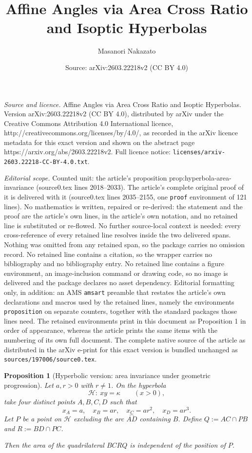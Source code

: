 \documentclass[10pt,a4paper]{amsart}
\title{Affine Angles via Area Cross Ratio and Isoptic Hyperbolas}
\author{Masanori Nakazato}
\date{Source: arXiv:2603.22218v2 (CC BY 4.0)}
\newtheorem{proposition}{Proposition}
\begin{document}
\maketitle

\noindent\emph{Source and licence.} Affine Angles via Area Cross Ratio and Isoptic Hyperbolas. Version arXiv:2603.22218v2 (CC BY 4.0), distributed by arXiv under the Creative Commons Attribution 4.0 International licence, http://creativecommons.org/licenses/by/4.0/, as recorded in the arXiv licence metadata for this exact version and shown on the abstract page https://arxiv.org/abs/2603.22218v2. Full licence notice: \texttt{licenses/arxiv-2603.22218-CC-BY-4.0.txt}.\par\smallskip

\noindent\textit{Editorial scope.} Counted unit: the article's proposition prop:hyperbola-area-invariance (source0.tex lines 2018--2033). The article's complete original proof of it is delivered with it (source0.tex lines 2035--2155, one \texttt{proof} environment of 121 lines). No mathematics is written, repaired or re-derived: the statement and the proof are the article's own lines, in the article's own notation, and no retained line is substituted or re-flowed.  No further source-local context is needed: every cross-reference of every retained line resolves inside the two delivered spans.  Nothing was omitted from any retained span, so the package carries no omission record.  No retained line contains a citation, so the wrapper carries no bibliography and no bibliography entry.  No retained line contains a figure environment, an image-inclusion command or drawing code, so no image is delivered and the package declares no asset dependency.  Editorial formatting only, in addition: an AMS \texttt{amsart} preamble that restates the article's own declarations and macros used by the retained lines, namely the environments \texttt{proposition} on separate counters, together with the standard packages those lines need.  The retained environments print in this document as Proposition 1 in order of appearance, whereas the article prints the same items with the numbering of its own full document.  The complete native source of the article as distributed in the arXiv e-print for this exact version is bundled unchanged as \texttt{sources/197006/source0.tex}.
\begin{proposition}[Hyperbolic version: area invariance under geometric progression]
\label{prop:hyperbola-area-invariance}
Let $a,r>0$ with $r\neq1$.
On the hyperbola
\[
\mathcal H:\ xy=\kappa \qquad (x>0),
\]
take four distinct points $A,B,C,D$ such that
\[
x_A=a,\quad x_B=ar,\quad x_C=ar^2,\quad x_D=ar^3.
\]
Let $P$ be a point on $\mathcal H$ excluding the arc $\overset{\frown}{AD}$ containing $B$.
Define $Q:=AC\cap PB$ and $R:=BD\cap PC$.

Then the area of the quadrilateral $BCRQ$ is independent of the position of $P$.
\end{proposition}
\end{document}
